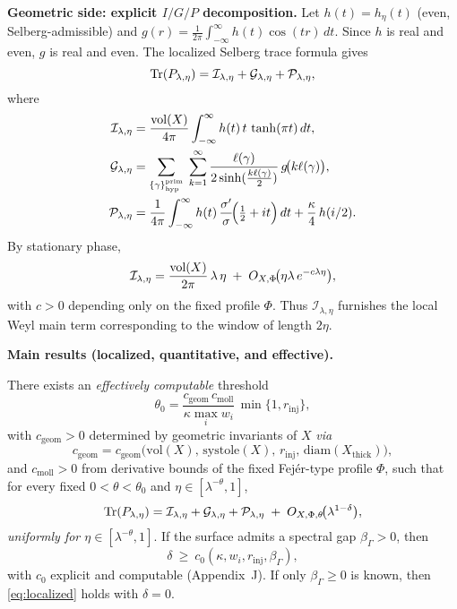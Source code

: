 \medskip
\noindent\textbf{Geometric side: explicit $I/G/P$ decomposition.}
Let $h(t)=h_\eta(t)$ (even, Selberg-admissible) and $g(r)=\frac{1}{2\pi}\int_{-\infty}^{\infty}h(t)\cos(tr)\,dt$. Since $h$ is real and even, $g$ is real and even. The localized Selberg trace formula gives
\begin{equation}\label{eq:IGP}
\operatorname{Tr}(P_{\lambda,\eta}) = \mathcal{I}_{\lambda,\eta}+\mathcal{G}_{\lambda,\eta}+\mathcal{P}_{\lambda,\eta},
\end{equation}
where
\begin{align}
\mathcal{I}_{\lambda,\eta} &= \frac{\operatorname{vol}(X)}{4\pi}\int_{-\infty}^{\infty} h(t)\,t\,\tanh(\pi t)\,dt, \label{eq:I}\\
\mathcal{G}_{\lambda,\eta} &= \sum_{\{\gamma\}_{\mathrm{hyp}}^{\mathrm{prim}}}\;\sum_{k=1}^{\infty} 
\frac{\ell(\gamma)}{2\sinh(\tfrac{k\ell(\gamma)}{2})}\, g\!\big(k\ell(\gamma)\big), \label{eq:G}\\
\mathcal{P}_{\lambda,\eta} &= \frac{1}{4\pi}\int_{-\infty}^{\infty} h(t)\,\frac{\sigma'}{\sigma}\!\Big(\tfrac12+it\Big)\,dt + \frac{\kappa}{4}\,h(i/2).\label{eq:P}
\end{align}
By stationary phase,
\begin{equation}\label{eq:weyl-main}
\mathcal{I}_{\lambda,\eta} = \frac{\operatorname{vol}(X)}{2\pi}\,\lambda\,\eta \;+\; O_{X,\Phi}\!\big(\eta\lambda\,e^{-c\lambda\eta}\big),
\end{equation}
with $c>0$ depending only on the fixed profile $\Phi$. Thus $\mathcal{I}_{\lambda,\eta}$ furnishes the local Weyl main term corresponding to the window of length $2\eta$.

\medskip
\noindent\textbf{Main results (localized, quantitative, and effective).}
\begin{theorem}\label{thm:localized}
There exists an \emph{effectively computable} threshold
\[
\theta_0=\frac{c_{\mathrm{geom}}\,c_{\mathrm{moll}}}{\kappa\max_i w_i}\,\min\{1,r_{\mathrm{inj}}\},
\]
with $c_{\mathrm{geom}}>0$ determined by geometric invariants of $X$ \emph{via}
\[
c_{\mathrm{geom}}=c_{\mathrm{geom}}\!\big(\mathrm{vol}(X),\,\mathrm{systole}(X),\,r_{\mathrm{inj}},\,\mathrm{diam}(X_{\mathrm{thick}})\big),
\]
and $c_{\mathrm{moll}}>0$ from derivative bounds of the fixed Fejér-type profile $\Phi$, such that for every fixed $0<\theta<\theta_0$ and $\eta\in[\lambda^{-\theta},1]$,
\begin{equation}\label{eq:localized}
\operatorname{Tr}(P_{\lambda,\eta}) = \mathcal{I}_{\lambda,\eta}+\mathcal{G}_{\lambda,\eta}+\mathcal{P}_{\lambda,\eta} \;+\; O_{X,\Phi,\theta}\!\big(\lambda^{1-\delta}\big),
\end{equation}
\emph{uniformly for $\eta\in[\lambda^{-\theta},1]$}. If the surface admits a spectral gap $\beta_\Gamma>0$, then
\begin{equation}\label{eq:delta-gap}
\delta\ \ge\ c_0(\kappa,{w_i},r_{\mathrm{inj}},\beta_\Gamma),
\end{equation}
with $c_0$ explicit and computable (Appendix~J). If only $\beta_\Gamma\ge0$ is known, then \eqref{eq:localized} holds with $\delta=0$.
\end{theorem}


